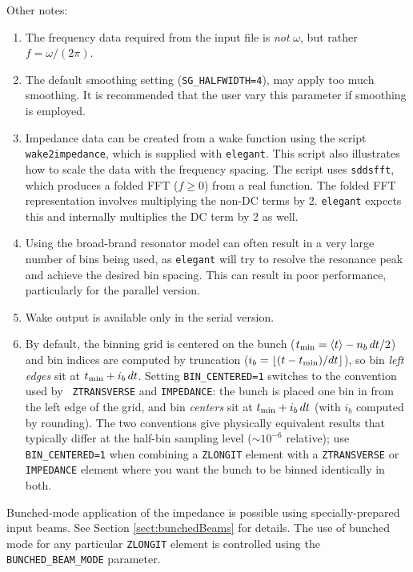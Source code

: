 Other notes:
\begin{enumerate}
\item The frequency data required from the input file is {\em not} $\omega$, but rather
  $f = \omega/(2 \pi)$.
\item The default smoothing setting ({\tt SG\_HALFWIDTH=4}), may apply too much smoothing.
  It is recommended that the user vary this parameter if smoothing is employed.
\item Impedance data can be created from a wake function using the script \verb|wake2impedance|,
  which is supplied with \verb|elegant|. This script also illustrates how to scale the data 
  with the frequency spacing. The script uses \verb|sddsfft|, which produces a
  folded FFT ($f\ge 0$) from a real function. The folded FFT representation involves multiplying the
  non-DC terms by 2. \verb|elegant| expects this and internally multiplies the DC term by 2 as well.
\item Using the broad-brand resonator model can often result in a very large number of bins
 being used, as {\tt elegant} will try to resolve the resonance peak and achieve the desired
 bin spacing. This can result in poor performance, particularly for the parallel version.
\item Wake output is available only in the serial version.
\item By default, the binning grid is centered on the bunch
  ($t_{\rm min} = \langle t\rangle - n_b\,dt/2$) and bin indices are
  computed by truncation ($i_b = \lfloor (t-t_{\rm min})/dt\rfloor$),
  so bin {\em left edges\/} sit at $t_{\rm min} + i_b\,dt$.  Setting
  {\tt BIN\_CENTERED=1} switches to the convention used by {\tt
  ZTRANSVERSE} and {\tt IMPEDANCE}: the bunch is placed one bin in
  from the left edge of the grid, and bin {\em centers\/} sit at
  $t_{\rm min} + i_b\,dt$ (with $i_b$ computed by rounding).  The two
  conventions give physically equivalent results that typically
  differ at the half-bin sampling level ($\sim 10^{-6}$ relative);
  use {\tt BIN\_CENTERED=1} when combining a {\tt ZLONGIT} element
  with a {\tt ZTRANSVERSE} or {\tt IMPEDANCE} element where you want
  the bunch to be binned identically in both.
\end{enumerate}

Bunched-mode application of the impedance is possible using specially-prepared input
beams. 
See Section \ref{sect:bunchedBeams} for details.
The use of bunched mode for any particular \verb|ZLONGIT| element is controlled using the \verb|BUNCHED_BEAM_MODE| parameter.
